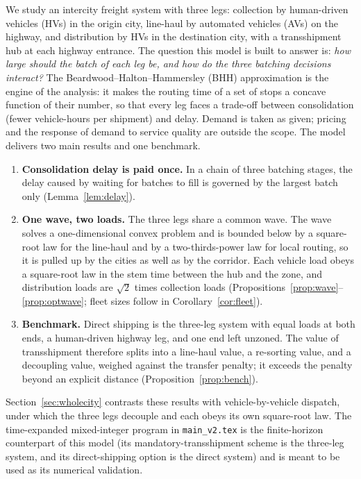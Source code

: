 \documentclass[10pt, reqno]{amsart}
\theoremstyle{definition}
\begin{document}
We study an intercity freight system with three legs: collection by human-driven vehicles (HVs) in the origin city, line-haul by automated vehicles (AVs) on the highway, and distribution by HVs in the destination city, with a transshipment hub at each highway entrance. The question this model is built to answer is: \emph{how large should the batch of each leg be, and how do the three batching decisions interact?} The Beardwood--Halton--Hammersley (BHH) approximation is the engine of the analysis: it makes the routing time of a set of stops a concave function of their number, so that every leg faces a trade-off between consolidation (fewer vehicle-hours per shipment) and delay. Demand is taken as given; pricing and the response of demand to service quality are outside the scope. The model delivers two main results and one benchmark.
\begin{enumerate}
\item \textbf{Consolidation delay is paid once.} In a chain of three batching stages, the delay caused by waiting for batches to fill is governed by the largest batch only (Lemma~\ref{lem:delay}).
\item \textbf{One wave, two loads.} The three legs share a common wave. The wave solves a one-dimensional convex problem and is bounded below by a square-root law for the line-haul and by a two-thirds-power law for local routing, so it is pulled up by the cities as well as by the corridor. Each vehicle load obeys a square-root law in the stem time between the hub and the zone, and distribution loads are $\sqrt2$ times collection loads (Propositions~\ref{prop:wave}--\ref{prop:optwave}; fleet sizes follow in Corollary~\ref{cor:fleet}).
\item \textbf{Benchmark.} Direct shipping is the three-leg system with equal loads at both ends, a human-driven highway leg, and one end left unzoned. The value of transshipment therefore splits into a line-haul value, a re-sorting value, and a decoupling value, weighed against the transfer penalty; it exceeds the penalty beyond an explicit distance (Proposition~\ref{prop:bench}).
\end{enumerate}
Section~\ref{sec:wholecity} contrasts these results with vehicle-by-vehicle dispatch, under which the three legs decouple and each obeys its own square-root law. The time-expanded mixed-integer program in \texttt{main\_v2.tex} is the finite-horizon counterpart of this model (its mandatory-transshipment scheme is the three-leg system, and its direct-shipping option is the direct system) and is meant to be used as its numerical validation.
\end{document}
